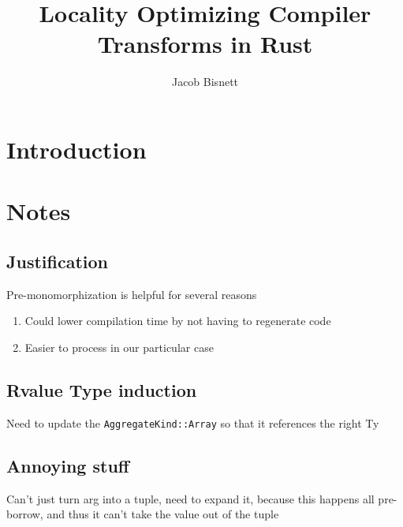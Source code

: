 \documentclass[12pt,final]{article}
\begin{document}
\title{Locality Optimizing Compiler Transforms in Rust}
\author{Jacob Bisnett}
\maketitle

\section{Introduction}
\label{sec:intro}


\section{Notes}
\label{sec:remove}

\subsection{Justification}
\label{sec:just}

Pre-monomorphization is helpful for several reasons
\begin{enumerate}
\item Could lower compilation time by not having to regenerate code
\item  Easier to process in our particular case
\end{enumerate}


\subsection{Rvalue Type induction}
Need to update the \texttt{AggregateKind::Array} so that it references the right Ty

\subsection{Annoying stuff}
\label{sec:annoying}

Can't just turn arg into a tuple, need to expand it, because this happens all
pre-borrow, and thus it can't take the value out of the tuple
\end{document}
